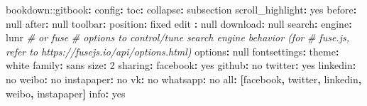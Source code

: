 \documentclass[
  12pt,
]{krantz}
\newenvironment{Shaded}{\begin{snugshade}}{\end{snugshade}}
\newcommand{\AttributeTok}[1]{\textcolor[rgb]{0.77,0.63,0.00}{#1}}
\newcommand{\CharTok}[1]{\textcolor[rgb]{0.31,0.60,0.02}{#1}}
\newcommand{\CommentTok}[1]{\textcolor[rgb]{0.56,0.35,0.01}{\textit{#1}}}
\newcommand{\DecValTok}[1]{\textcolor[rgb]{0.00,0.00,0.81}{#1}}
\newcommand{\FunctionTok}[1]{\textcolor[rgb]{0.00,0.00,0.00}{#1}}
\newcommand{\KeywordTok}[1]{\textcolor[rgb]{0.13,0.29,0.53}{\textbf{#1}}}
\newcommand{\StringTok}[1]{\textcolor[rgb]{0.31,0.60,0.02}{#1}}
\theoremstyle{definition}
\theoremstyle{definition}
\theoremstyle{definition}
\theoremstyle{definition}
\theoremstyle{remark}
\begin{document}
\begin{Shaded}
\begin{Highlighting}[]
\AttributeTok{bookdown:}\FunctionTok{:gitbook}\KeywordTok{:}
\AttributeTok{  }\FunctionTok{config}\KeywordTok{:}
\AttributeTok{    }\FunctionTok{toc}\KeywordTok{:}
\AttributeTok{      }\FunctionTok{collapse}\KeywordTok{:}\AttributeTok{ subsection}
\AttributeTok{      }\FunctionTok{scroll\_highlight}\KeywordTok{:}\AttributeTok{ }\CharTok{yes}
\AttributeTok{      }\FunctionTok{before}\KeywordTok{:}\AttributeTok{ }\CharTok{null}
\AttributeTok{      }\FunctionTok{after}\KeywordTok{:}\AttributeTok{ }\CharTok{null}
\AttributeTok{    }\FunctionTok{toolbar}\KeywordTok{:}
\AttributeTok{      }\FunctionTok{position}\KeywordTok{:}\AttributeTok{ fixed}
\AttributeTok{    }\FunctionTok{edit }\KeywordTok{:}\AttributeTok{ }\CharTok{null}
\AttributeTok{    }\FunctionTok{download}\KeywordTok{:}\AttributeTok{ }\CharTok{null}
\AttributeTok{    }\FunctionTok{search}\KeywordTok{:}
\AttributeTok{      }\FunctionTok{engine}\KeywordTok{:}\AttributeTok{ lunr}\CommentTok{ \# or fuse}
\CommentTok{      \# options to control/tune search engine behavior (for}
\CommentTok{      \# fuse.js, refer to https://fusejs.io/api/options.html)}
\AttributeTok{      }\FunctionTok{options}\KeywordTok{:}\AttributeTok{ }\CharTok{null}
\AttributeTok{    }\FunctionTok{fontsettings}\KeywordTok{:}
\AttributeTok{      }\FunctionTok{theme}\KeywordTok{:}\AttributeTok{ white}
\AttributeTok{      }\FunctionTok{family}\KeywordTok{:}\AttributeTok{ sans}
\AttributeTok{      }\FunctionTok{size}\KeywordTok{:}\AttributeTok{ }\DecValTok{2}
\AttributeTok{    }\FunctionTok{sharing}\KeywordTok{:}
\AttributeTok{      }\FunctionTok{facebook}\KeywordTok{:}\AttributeTok{ }\CharTok{yes}
\AttributeTok{      }\FunctionTok{github}\KeywordTok{:}\AttributeTok{ }\CharTok{no}
\AttributeTok{      }\FunctionTok{twitter}\KeywordTok{:}\AttributeTok{ }\CharTok{yes}
\AttributeTok{      }\FunctionTok{linkedin}\KeywordTok{:}\AttributeTok{ }\CharTok{no}
\AttributeTok{      }\FunctionTok{weibo}\KeywordTok{:}\AttributeTok{ }\CharTok{no}
\AttributeTok{      }\FunctionTok{instapaper}\KeywordTok{:}\AttributeTok{ }\CharTok{no}
\AttributeTok{      }\FunctionTok{vk}\KeywordTok{:}\AttributeTok{ }\CharTok{no}
\AttributeTok{      }\FunctionTok{whatsapp}\KeywordTok{:}\AttributeTok{ }\CharTok{no}
\AttributeTok{      }\FunctionTok{all}\KeywordTok{:}\AttributeTok{ }\KeywordTok{[}\StringTok{\textquotesingle{}facebook\textquotesingle{}}\KeywordTok{,}\AttributeTok{ }\StringTok{\textquotesingle{}twitter\textquotesingle{}}\KeywordTok{,}\AttributeTok{ }\StringTok{\textquotesingle{}linkedin\textquotesingle{}}\KeywordTok{,}\AttributeTok{ }\StringTok{\textquotesingle{}weibo\textquotesingle{}}\KeywordTok{,}\AttributeTok{ }\StringTok{\textquotesingle{}instapaper\textquotesingle{}}\KeywordTok{]}
\AttributeTok{    }\FunctionTok{info}\KeywordTok{:}\AttributeTok{ }\CharTok{yes}
\end{Highlighting}
\end{Shaded}
\end{document}
